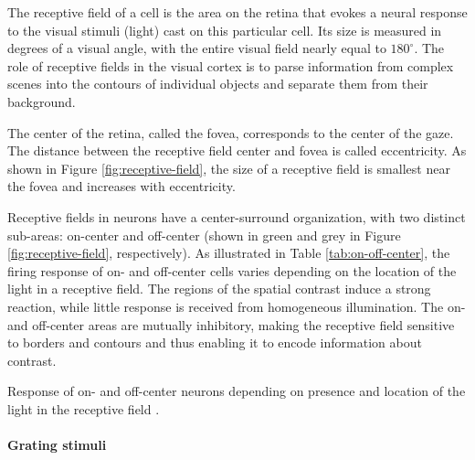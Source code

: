 The receptive field of a cell is the area on the retina that evokes a neural response to the visual stimuli (light) cast on this particular cell. Its size is measured in degrees of a visual angle, with the entire visual field nearly equal to $180^\circ$. The role of receptive fields in the visual cortex is to parse information from complex scenes into the contours of individual objects and separate them from their background.

The center of the retina, called the fovea, corresponds to the center of the gaze. The distance between the receptive field center and fovea is called eccentricity. As shown in Figure \ref{fig:receptive-field}, the size of a receptive field is smallest near the fovea and increases with eccentricity.

Receptive fields in neurons have a center-surround organization, with two distinct sub-areas: on-center and off-center (shown in green and grey in Figure \ref{fig:receptive-field}, respectively). As illustrated in Table \ref{tab:on-off-center}, the firing response of on- and off-center cells varies depending on the location of the light in a receptive field. The regions of the spatial contrast induce a strong reaction, while little response is received from homogeneous illumination. The on- and off-center areas are mutually inhibitory, making the receptive field sensitive to borders and contours and thus enabling it to encode information about contrast.

\begin{table}[!htp]
    \centering
    
    \caption[Neural response vs. light location]{Response of on- and off-center neurons depending on presence and location of the light in the receptive field \cite{KandelBook2003:25}.}
    \label{tab:on-off-center}
\end{table}

\paragraph{Grating stimuli}

